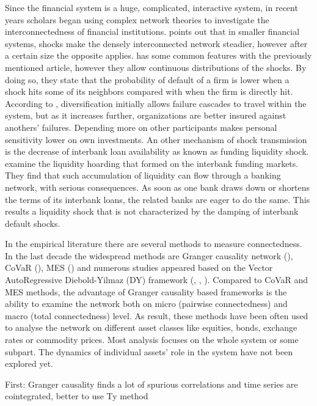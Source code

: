 \documentclass[12pt,bibliography=totoc]{article}
\begin{document}
Since the financial system is a huge, complicated, interactive system, in recent years scholars began using complex network theories to investigate the interconnectedness of financial institutions. 
\cite{acemoglu2015systemic} points out that in smaller financial systems, shocks make the densely interconnected network steadier, however after a certain size the opposite applies. 
\cite{glasserman2015likely} has some common features with the previously mentioned article, however they allow continuous distributions of the shocks. 
By doing so, they state that the probability of default of a firm is lower when a shock hits some of its neighbors compared with when the firm is directly hit.
According to \cite{elliott2014financial}, diversification initially allows failure cascades to travel within the system, but as it increases further, organizations are better insured against anothers' failures. 
Depending more on other participants makes personal sensitivity lower on own investments. 
An other mechanism of shock transmission is the decrease of interbank loan availability as known as funding liquidity shock.
\cite{gai2010contagion} examine the liquidity hoarding that formed on the interbank funding markets. 
They find that such accumulation of liquidity can flow through a banking network, with serious consequences. 
As soon as one bank draws down or shortens the terms of its interbank loans, the related banks are eager to do the same. 
This results a liquidity shock that is not characterized by the damping of interbank default shocks.

In the empirical literature there are several methods to measure connectedness. 
In the last decade the widespread methods are Granger causality network (\cite{billio2012econometric}), CoVaR (\cite{adrian2008federal}), MES (\cite{acharya2012capital}) and numerous studies appeared based on the Vector AutoRegressive Diebold-Yilmaz (DY) framework (\cite{diebold2009measuring}, \cite{diebold2012better}, \cite{diebold2014network}). 
Compared to CoVaR and MES methods, the advantage of Granger causality based frameworks is the ability to examine the network both on micro (pairwise connectedness) and macro (total connectedness) level. 
As result, these methods have been often used to analyse the network on different asset classes like equities, bonds, exchange rates or commodity prices. 
Most analysis focuses on the whole system or some subpart. The dynamics of individual assets' role in the system have not been explored yet.

First: Granger causality finds a lot of spurious correlations and time series are cointegrated, better to use Ty method
\end{document}
